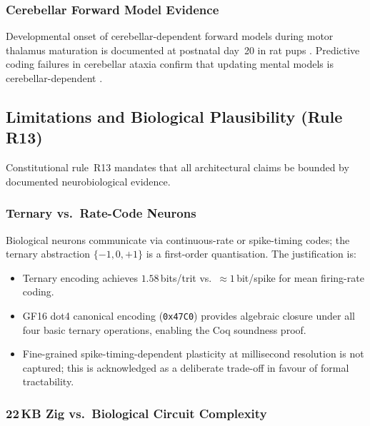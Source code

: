 \subsubsection{Cerebellar Forward Model Evidence}

Developmental onset of cerebellar-dependent forward models during motor
thalamus maturation is documented at postnatal day~20 in rat pups
\cite{dooley_2021}.  Predictive coding failures in cerebellar ataxia confirm
that updating mental models is cerebellar-dependent \cite{tunc_2019}.


\subsection{Limitations and Biological Plausibility (Rule R13)}
\label{ssec:flos73-limits}

Constitutional rule~R13 mandates that all architectural claims be bounded by
documented neurobiological evidence.

\subsubsection{Ternary vs.\ Rate-Code Neurons}

Biological neurons communicate via continuous-rate or spike-timing codes;
the ternary abstraction $\{-1, 0, +1\}$ is a first-order quantisation.  The
justification is:
\begin{itemize}
  \item Ternary encoding achieves $1.58$\,bits/trit vs.\ ${\approx}1$\,bit/spike
    for mean firing-rate coding.
  \item GF16 dot4 canonical encoding (\texttt{0x47C0}) provides algebraic
    closure under all four basic ternary operations, enabling the Coq
    soundness proof.
  \item Fine-grained spike-timing-dependent plasticity at millisecond
    resolution is not captured; this is acknowledged as a deliberate
    trade-off in favour of formal tractability.
\end{itemize}

\subsubsection{22\,KB Zig vs.\ Biological Circuit Complexity}

